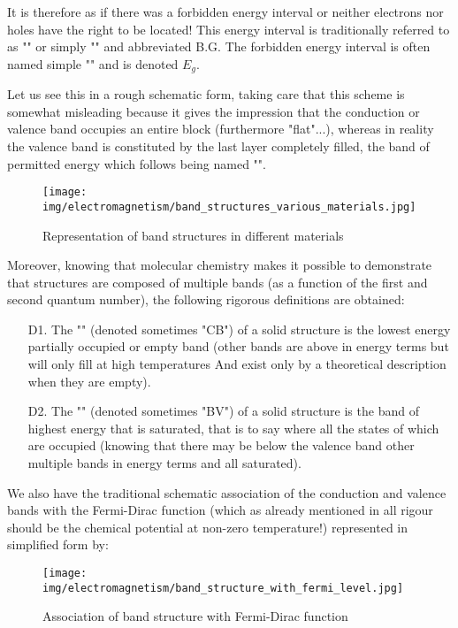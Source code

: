 	It is therefore as if there was a forbidden energy interval or neither electrons nor holes have the right to be located! This energy interval is traditionally referred to as "" or simply "" and abbreviated B.G. The forbidden energy interval is often named simple "" and is denoted $E_g$.

	Let us see this in a rough schematic form, taking care that this scheme is somewhat misleading because it gives the impression that the conduction or valence band occupies an entire block (furthermore "flat"...), whereas in reality the valence band is constituted by the last layer completely filled, the band of permitted energy which follows being named "".
	\begin{figure}[H]
		\centering
		\texttt{[image: img/electromagnetism/band\_structures\_various\_materials.jpg]}
		\caption{Representation of band structures in different materials}
	\end{figure}
	Moreover, knowing that molecular chemistry makes it possible to demonstrate that structures are composed of multiple bands (as a function of the first and second quantum number), the following rigorous definitions are obtained:
	\begin{enumerate}
		\item[D1.] The "" (denoted sometimes "CB") of a solid structure is the lowest energy partially occupied or empty  band (other bands are above in energy terms but will only fill at high temperatures And exist only by a theoretical description when they are empty).

		\item[D2.] The "" (denoted sometimes "BV") of a solid structure is the band of highest energy that is saturated, that is to say where all the states of which are occupied (knowing that there may be below the valence band other multiple bands in energy terms and all saturated).
	\end{enumerate}
	We also have the traditional schematic association of the conduction and valence bands with the Fermi-Dirac function (which as already mentioned in all rigour should be the chemical potential at non-zero temperature!) represented in simplified form by:
	\begin{figure}[H]
		\centering
		\texttt{[image: img/electromagnetism/band\_structure\_with\_fermi\_level.jpg]}
		\caption{Association of band structure with Fermi-Dirac function}
	\end{figure}

